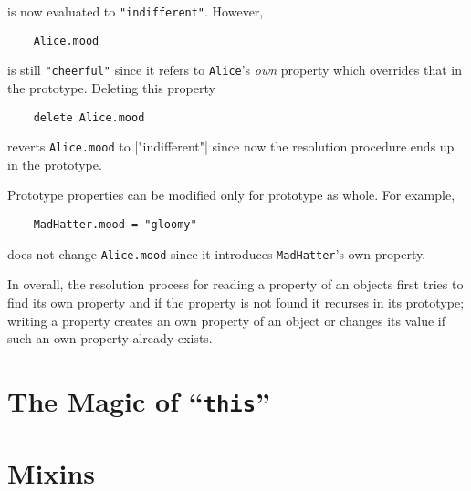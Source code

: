 \documentclass{article}
\begin{document}
is now evaluated to \lstinline|"indifferent"|. However,

\begin{lstlisting}
    Alice.mood
\end{lstlisting}

is still \lstinline|"cheerful"| since it refers to \lstinline|Alice|'s \emph{own}
property which overrides that in the prototype. Deleting this property

\begin{lstlisting}
    delete Alice.mood
\end{lstlisting}

reverts \lstinline|Alice.mood| to \lstinlin|"indifferent"| since now the resolution
procedure ends up in the prototype.

Prototype properties can be modified only for prototype as whole. For example,

\begin{lstlisting}
    MadHatter.mood = "gloomy"
\end{lstlisting}

does not change \lstinline|Alice.mood| since it introduces \lstinline|MadHatter|'s own
property.

In overall, the resolution process for reading a property of an objects first
tries to find its own property and if the property is not found it recurses in
its prototype; writing a property creates an own property of an object or
changes its value if such an own property already exists. 


\section{The Magic of ``\lstinline[basicstyle=\normal]|this|''}
\label{sec:this}

\section{Mixins}
\end{document}
